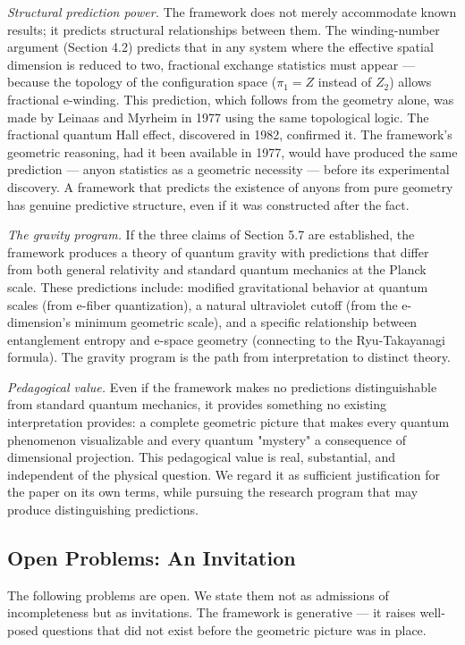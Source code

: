 \documentclass[aps,prd,preprint,superscriptaddress,longbibliography,floatfix]{revtex4-2}
\theoremstyle{remark}
\begin{document}
\textit{Structural prediction power.} The framework does not merely accommodate known results; it predicts structural relationships between them. The winding-number argument (Section 4.2) predicts that in any system where the effective spatial dimension is reduced to two, fractional exchange statistics must appear --- because the topology of the configuration space ($\pi_{1} = Z$ instead of $Z_{2}$) allows fractional e-winding. This prediction, which follows from the geometry alone, was made by Leinaas and Myrheim in 1977 using the same topological logic. The fractional quantum Hall effect, discovered in 1982, confirmed it. The framework's geometric reasoning, had it been available in 1977, would have produced the same prediction --- anyon statistics as a geometric necessity --- before its experimental discovery. A framework that predicts the existence of anyons from pure geometry has genuine predictive structure, even if it was constructed after the fact.

\textit{The gravity program.} If the three claims of Section 5.7 are established, the framework produces a theory of quantum gravity with predictions that differ from both general relativity and standard quantum mechanics at the Planck scale. These predictions include: modified gravitational behavior at quantum scales (from e-fiber quantization), a natural ultraviolet cutoff (from the e-dimension's minimum geometric scale), and a specific relationship between entanglement entropy and e-space geometry (connecting to the Ryu-Takayanagi formula). The gravity program is the path from interpretation to distinct theory.

\textit{Pedagogical value.} Even if the framework makes no predictions distinguishable from standard quantum mechanics, it provides something no existing interpretation provides: a complete geometric picture that makes every quantum phenomenon visualizable and every quantum "mystery" a consequence of dimensional projection. This pedagogical value is real, substantial, and independent of the physical question. We regard it as sufficient justification for the paper on its own terms, while pursuing the research program that may produce distinguishing predictions.



\subsection{Open Problems: An Invitation}

The following problems are open. We state them not as admissions of incompleteness but as invitations. The framework is generative --- it raises well-posed questions that did not exist before the geometric picture was in place.
\end{document}
